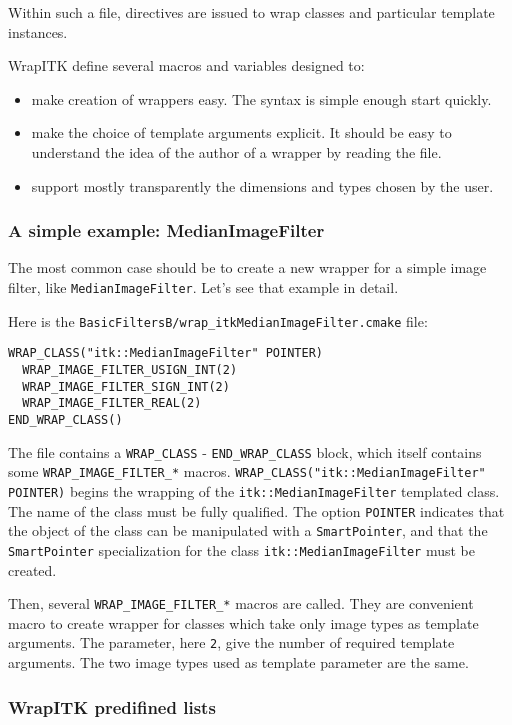 \documentclass{InsightArticle}
\begin{document}
Within such a file, directives are issued to wrap classes and particular
template instances. 

WrapITK define several macros and variables designed to:
\begin{itemize}
  \item make creation of wrappers easy. The syntax is simple enough start quickly.
  \item make the choice of template arguments explicit. It should be easy to understand
the idea of the author of a wrapper by reading the file.
  \item support mostly transparently the dimensions and types chosen by the user.
\end{itemize}

     \subsubsection{A simple example: MedianImageFilter}

The most common case should be to create a new wrapper for a simple image filter, like 
\verb$MedianImageFilter$. Let's see that example in detail.

Here is the \verb$BasicFiltersB/wrap_itkMedianImageFilter.cmake$ file:

\small \begin{verbatim}
WRAP_CLASS("itk::MedianImageFilter" POINTER)
  WRAP_IMAGE_FILTER_USIGN_INT(2)
  WRAP_IMAGE_FILTER_SIGN_INT(2)
  WRAP_IMAGE_FILTER_REAL(2)
END_WRAP_CLASS()
\end{verbatim} \normalsize

The file contains a \verb$WRAP_CLASS$ - \verb$END_WRAP_CLASS$ block, which itself contains
some \verb$WRAP_IMAGE_FILTER_*$ macros. \verb$WRAP_CLASS("itk::MedianImageFilter" POINTER)$
begins the wrapping of the \verb$itk::MedianImageFilter$ templated class. The name of the class
must be fully qualified. The option \verb$POINTER$ indicates that the object of the class can be
manipulated with a \verb$SmartPointer$, and that the \verb$SmartPointer$ specialization for
the class \verb$itk::MedianImageFilter$ must be created.

Then, several \verb$WRAP_IMAGE_FILTER_*$ macros are called. They are convenient macro to
create wrapper for classes which take only image types as template arguments. The parameter,
here \verb$2$, give the number of required template arguments. The two image types used as
template parameter are the same.

     \subsubsection{WrapITK predifined lists}
\end{document}
